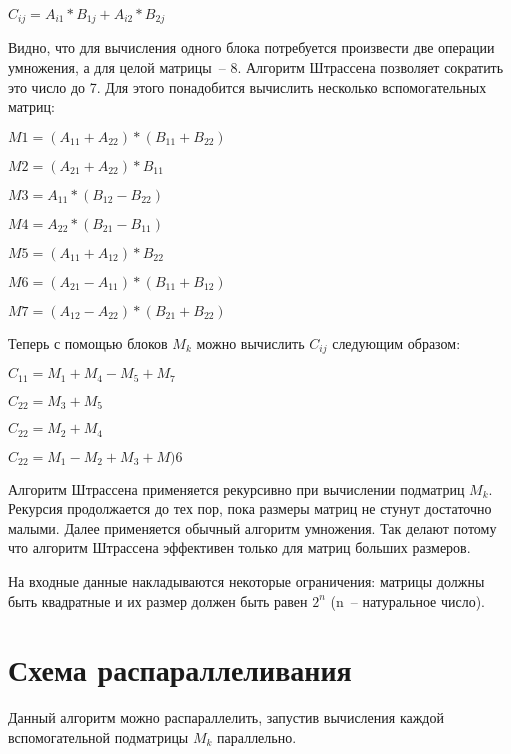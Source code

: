 \documentclass{report}
\begin{document}
\begin{center}
$C_{ij}=A_{i1}*B_{1j}+A_{i2}*B_{2j}$
\par Видно, что для вычисления одного блока потребуется произвести две операции умножения, а для целой матрицы~-- 8. Алгоритм Штрассена позволяет сократить это число до 7. Для этого понадобится вычислить несколько вспомогательных матриц:
\begin{minipage}{0.5\textwidth}
$M1=(A_{11} + A_{22})*(B_{11} + B_{22})$

$M2=(A_{21} + A_{22})*B_{11}$

$M3=A_{11}*(B_{12} - B_{22})$

$M4=A_{22}*(B_{21} - B_{11})$

$M5=(A_{11} + A_{12})*B_{22}$

$M6=(A_{21} - A_{11})*(B_{11} + B_{12})$

$M7=(A_{12} - A_{22})*(B_{21} + B_{22})$
\end{minipage}
\par Теперь с помощью блоков $M_k$ можно вычислить $C_{ij}$ следующим образом:
\begin{minipage}{0.5\textwidth}
$C_{11}=M_1+M_4-M_5+M_7$

$C_{22}=M_3+M_5$

$C_{22}=M_2+M_4$

$C_{22}=M_1-M_2+M_3+M)6$
\end{minipage}
\par Алгоритм Штрассена применяется рекурсивно при вычислении подматриц $M_k$. Рекурсия продолжается до тех пор, пока размеры матриц не стунут достаточно малыми. Далее применяется обычный алгоритм умножения. Так делают потому что алгоритм Штрассена эффективен только для матриц больших размеров.
\par На входные данные накладываются некоторые ограничения: матрицы должны быть квадратные и их размер должен быть равен $2^n$ (n~-- натуральное число).


\section{Схема распараллеливания}
\par Данный алгоритм можно распараллелить, запустив вычисления каждой вспомогательной подматрицы $M_k$ параллельно.





\end{center}
\end{document}
